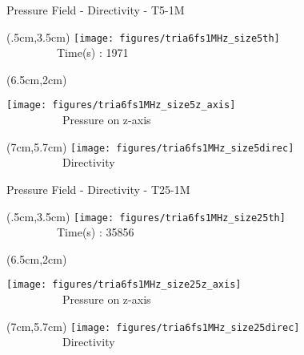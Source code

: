 \documentclass{beamer}
\begin{document}
\begin{frame}{Pressure Field - Directivity - T5-1M}
\begin{textblock*}{5cm}(.5cm,3.5cm) %
\texttt{[image: figures/tria6fs1MHz\_size5th]}
\newline \ \ \\ \ \ \ \ \ \ \ \ \ {\scriptsize Time(s) : 1971}
\end{textblock*}
\begin{textblock*}{5cm}(6.5cm,2cm) %

	\texttt{[image: figures/tria6fs1MHz\_size5z\_axis]}
	\\\ \ \ \ \ \ \ \ \ \ {\scriptsize Pressure on z-axis}
\end{textblock*}
\begin{textblock*}{5cm}(7cm,5.7cm) %
	\texttt{[image: figures/tria6fs1MHz\_size5direc]}
		\\\ \ \ \ \ \ \ \ \ \ {\scriptsize Directivity}
\end{textblock*}
\end{frame}

\begin{frame}{Pressure Field - Directivity - T25-1M}
\begin{textblock*}{5cm}(.5cm,3.5cm) %
\texttt{[image: figures/tria6fs1MHz\_size25th]}
\newline \ \ \\ \ \ \ \ \ \ \ \ \ {\scriptsize Time(s) : 35856}
\end{textblock*}
\begin{textblock*}{5cm}(6.5cm,2cm) %

	\texttt{[image: figures/tria6fs1MHz\_size25z\_axis]}
	\\\ \ \ \ \ \ \ \ \ \ {\scriptsize Pressure on z-axis}
\end{textblock*}
\begin{textblock*}{5cm}(7cm,5.7cm) %
	\texttt{[image: figures/tria6fs1MHz\_size25direc]}
		\\\ \ \ \ \ \ \ \ \ \ {\scriptsize Directivity}
\end{textblock*}
\end{frame}
\end{document}
